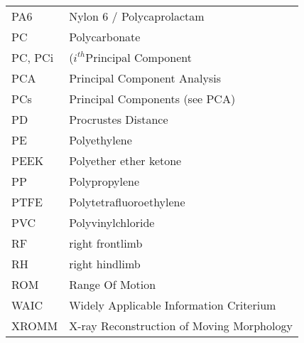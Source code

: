 \begin{small}
\begin{longtable}{l @{ -- } l}
\\ PA6 & Nylon 6 / Polycaprolactam
\\ PC & Polycarbonate
\\ PC, PCi & (\(i^{th}\)Principal Component
\\ PCA & Principal Component Analysis
\\ PCs & Principal Components (see PCA)
\\ PD & Procrustes Distance
\\ PE & Polyethylene
\\ PEEK & Polyether ether ketone
\\ PP & Polypropylene
\\ PTFE & Polytetrafluoroethylene
\\ PVC & Polyvinylchloride
\\ RF & right frontlimb
\\ RH & right hindlimb
\\ ROM & Range Of Motion
\\ WAIC & Widely Applicable Information Criterium
\\ XROMM & X-ray Reconstruction of Moving Morphology
\end{longtable}
\end{small}
